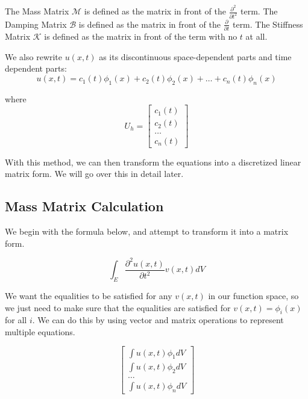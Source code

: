 The Mass Matrix $\mathcal{M}$ is defined as the matrix in front of the $\frac{\partial^2}{\partial t^2}$ term. The Damping Matrix $\mathcal{B}$ is defined as the matrix in front of the $\frac{\partial}{\partial t}$ term. The Stiffness Matrix $\mathcal{K}$ is defined as the matrix in front of the term with no $t$ at all. 

We also rewrite $u(x,t)$ as its discontinuous space-dependent parts and time dependent parts:
\begin{equation}
u(x,t) = c_1(t) \phi_1(x) + c_2(t) \phi_2(x) + \ldots + c_n(t) \phi_n(x)
\end{equation}

where \begin{equation}
U_h = \begin{bmatrix}
c_1(t) \\
c_2(t) \\
\ldots \\
c_n(t)
\end{bmatrix}
\end{equation}

With this method, we can then transform the equations into a discretized linear matrix form. We will go over this in detail later. 


\subsection{Mass Matrix Calculation}

We begin with the formula below, and attempt to transform it into a matrix form.

\begin{equation}
\int_E \frac{\partial^2 u(x,t)}{\partial t^2} v(x,t) dV
\end{equation}

We want the equalities to be satisfied for any $v(x,t)$ in our function space, so we just need to make sure that the equalities are satisfied for $v(x,t) = \phi_i(x)$ for all $i$. We can do this by using vector and matrix operations to represent multiple equations.

\begin{equation}
\begin{bmatrix}
\int u(x,t) \phi_1 dV \\
\int u(x,t) \phi_2 dV \\
\ldots \\
\int u(x,t) \phi_n dV
\end{bmatrix}
\end{equation}

